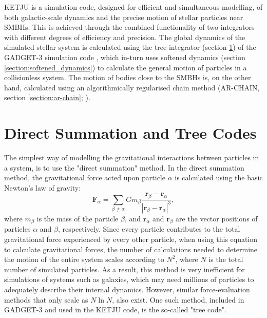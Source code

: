 \documentclass[english, twoside]{HYgradu}
\begin{document}
KETJU \citep{Rantala2017KETJU} is a simulation code, designed for efficient and simultaneous modelling, of both galactic-scale dynamics and the precise motion of stellar particles near SMBHs. This is achieved through the combined functionality of two integrators with different degrees of efficiency and precision. The global dynamics of the simulated stellar system is calculated using the tree-integrator (section \ref{section:tree}) of the GADGET-3 simulation code \citep{Springel2005}, which in-turn uses softened dynamics (section \ref{section:softened_dynamics}) to calculate the general motion of particles in a collisionless system. The motion of bodies close to the SMBHs is, on the other hand, calculated using an algorithmically regularised chain method (AR-CHAIN, section \ref{section:ar-chain}; \citealt{Mikkola2008ARCHAIN}).

\section{Direct Summation and Tree Codes} \label{section:tree}

The simplest way of modelling the gravitational interactions between particles in a system, is to use the "direct summation" method. In the direct summation method, the gravitational force acted upon particle $\alpha$ is calculated using the basic Newton's law of gravity:
\begin{equation}
\mathbf{F}_\alpha = \displaystyle\sum_{\beta \neq \alpha} Gm_\beta \frac{\mathbf{r}_\beta-\mathbf{r}_\alpha}{|\mathbf{r}_\beta-\mathbf{r}_\alpha|^3}, \label{eq:f_alpha}
\end{equation}
where $m_\beta$ is the mass of the particle $\beta$, and $\mathbf{r}_\alpha$ and $\mathbf{r}_\beta$ are the vector positions of particles $\alpha$ and $\beta$, respectively. Since every particle contributes to the total gravitational force experienced by every other particle, when using this equation to calculate gravitational forces, the number of calculations needed to determine the motion of the entire system scales according to $N^2$, where $N$ is the total number of simulated particles. As a result, this method is very inefficient for simulations of systems such as galaxies, which may need millions of particles to adequately describe their internal dynamics. However, similar force-evaluation methods that only scale as $N\ln N$, also exist. One such method, included in GADGET-3 and used in the KETJU code, is the so-called "tree code".
\end{document}
